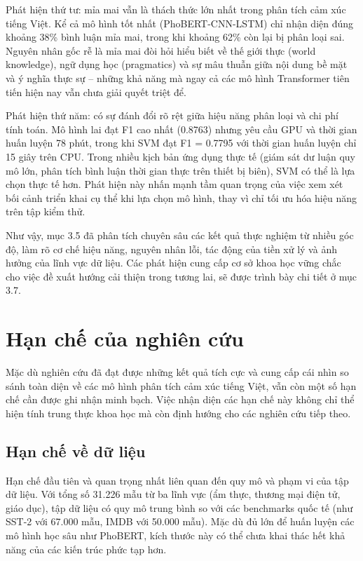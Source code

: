 \documentclass[14pt, a4paper]{report}
\begin{document}
Phát hiện thứ tư: mỉa mai vẫn là thách thức lớn nhất trong phân tích cảm xúc tiếng Việt. Kể cả mô hình tốt nhất (PhoBERT-CNN-LSTM) chỉ nhận diện đúng khoảng 38\% bình luận mỉa mai, trong khi khoảng 62\% còn lại bị phân loại sai. Nguyên nhân gốc rễ là mỉa mai đòi hỏi hiểu biết về thế giới thực (world knowledge), ngữ dụng học (pragmatics) và sự mâu thuẫn giữa nội dung bề mặt và ý nghĩa thực sự – những khả năng mà ngay cả các mô hình Transformer tiên tiến hiện nay vẫn chưa giải quyết triệt để.


Phát hiện thứ năm: có sự đánh đổi rõ rệt giữa hiệu năng phân loại và chi phí tính toán. Mô hình lai đạt F1 cao nhất (0.8763) nhưng yêu cầu GPU và thời gian huấn luyện 78 phút, trong khi SVM đạt F1 = 0.7795 với thời gian huấn luyện chỉ 15 giây trên CPU. Trong nhiều kịch bản ứng dụng thực tế (giám sát dư luận quy mô lớn, phân tích bình luận thời gian thực trên thiết bị biên), SVM có thể là lựa chọn thực tế hơn. Phát hiện này nhấn mạnh tầm quan trọng của việc xem xét bối cảnh triển khai cụ thể khi lựa chọn mô hình, thay vì chỉ tối ưu hóa hiệu năng trên tập kiểm thử.


Như vậy, mục 3.5 đã phân tích chuyên sâu các kết quả thực nghiệm từ nhiều góc độ, làm rõ cơ chế hiệu năng, nguyên nhân lỗi, tác động của tiền xử lý và ảnh hưởng của lĩnh vực dữ liệu. Các phát hiện cung cấp cơ sở khoa học vững chắc cho việc đề xuất hướng cải thiện trong tương lai, sẽ được trình bày chi tiết ở mục 3.7.


\section{Hạn chế của nghiên cứu}


Mặc dù nghiên cứu đã đạt được những kết quả tích cực và cung cấp cái nhìn so sánh toàn diện về các mô hình phân tích cảm xúc tiếng Việt, vẫn còn một số hạn chế cần được ghi nhận minh bạch. Việc nhận diện các hạn chế này không chỉ thể hiện tính trung thực khoa học mà còn định hướng cho các nghiên cứu tiếp theo.


\subsection{Hạn chế về dữ liệu}


Hạn chế đầu tiên và quan trọng nhất liên quan đến quy mô và phạm vi của tập dữ liệu. Với tổng số 31.226 mẫu từ ba lĩnh vực (ẩm thực, thương mại điện tử, giáo dục), tập dữ liệu có quy mô trung bình so với các benchmarks quốc tế (như SST-2 với 67.000 mẫu, IMDB với 50.000 mẫu). Mặc dù đủ lớn để huấn luyện các mô hình học sâu như PhoBERT, kích thước này có thể chưa khai thác hết khả năng của các kiến trúc phức tạp hơn.
\end{document}

